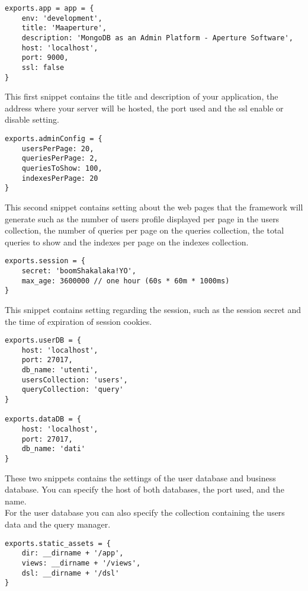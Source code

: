 \begin{lstlisting}
exports.app = app = {
	env: 'development',
	title: 'Maaperture',
	description: 'MongoDB as an Admin Platform - Aperture Software',
	host: 'localhost',
	port: 9000,
	ssl: false
}

\end{lstlisting}

This first snippet contains the title and description of your application, the address where your server will be hosted, the port used and the ssl enable or disable setting.\\

\begin{lstlisting}
exports.adminConfig = {
	usersPerPage: 20,
	queriesPerPage: 2,
	queriesToShow: 100,
	indexesPerPage: 20
}
\end{lstlisting}

This second snippet contains setting about the web pages that the framework will generate such as the number of users profile displayed per page in the users collection, the number of queries per page on the queries collection, the total queries to show and the indexes per page on the indexes collection.\\

\begin{lstlisting}
exports.session = {
	secret: 'boomShakalaka!YO',
	max_age: 3600000 // one hour (60s * 60m * 1000ms)
}
\end{lstlisting}

This snippet contains setting regarding the session, such as the session secret and the time of expiration of session cookies.\\

\begin{lstlisting}
exports.userDB = {
	host: 'localhost',
	port: 27017,
	db_name: 'utenti',
	usersCollection: 'users',
	queryCollection: 'query'
}

exports.dataDB = {
	host: 'localhost',
	port: 27017,
	db_name: 'dati'
}
\end{lstlisting}

These two snippets contains the settings of the user database and business database.
You can specify the host of both databases, the port used, and the name.\\

For the user database you can also specify the collection containing the users data and the query manager.\\


\begin{lstlisting}
exports.static_assets = {
	dir: __dirname + '/app',
	views: __dirname + '/views',
	dsl: __dirname + '/dsl'
}
\end{lstlisting}

